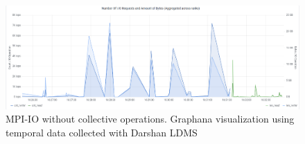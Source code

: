 \begin{figure}
	\centering
	\includegraphics[width=\textwidth]{figs/255653_mpi_io_luster_no_coll.pdf}
	\caption{MPI-IO without collective operations. Graphana visualization using temporal data collected
          with Darshan LDMS}
	\label{f:CSV Header and Output}
\end{figure}